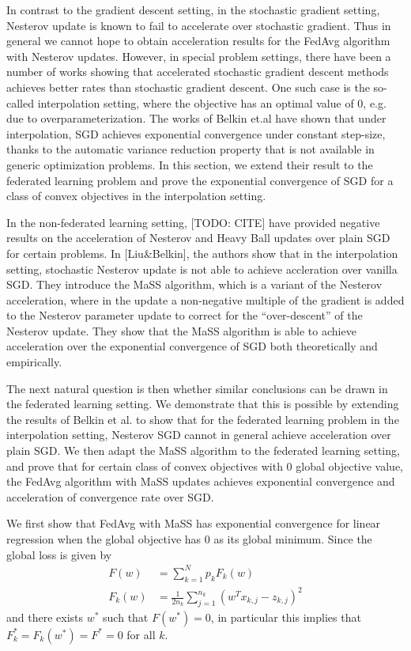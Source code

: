 In contrast to the gradient descent setting, in the stochastic gradient
setting, Nesterov update is known to fail to accelerate over stochastic
gradient. Thus in general we cannot hope to obtain acceleration results
for the FedAvg algorithm with Nesterov updates. However, in special
problem settings, there have been a number of works showing that accelerated
stochastic gradient descent methods achieves better rates than stochastic
gradient descent. One such case is the so-called interpolation setting,
where the objective has an optimal value of 0, e.g. due to overparameterization.
The works of Belkin et.al have shown that under interpolation, SGD
achieves exponential convergence under constant step-size, thanks
to the automatic variance reduction property that is not available
in generic optimization problems. In this section, we extend their
result to the federated learning problem and prove the exponential
convergence of SGD for a class of convex objectives in the interpolation
setting.

In the non-federated learning setting, {[}TODO: CITE{]} have provided
negative results on the acceleration of Nesterov and Heavy Ball updates
over plain SGD for certain problems. In {[}Liu\&Belkin{]}, the authors
show that in the interpolation setting, stochastic Nesterov update
is not able to achieve accleration over vanilla SGD. They introduce
the MaSS algorithm, which is a variant of the Nesterov acceleration,
where in the update a non-negative multiple of the gradient is added
to the Nesterov parameter update to correct for the ``over-descent''
of the Nesterov update. They show that the MaSS algorithm is able
to achieve acceleration over the exponential convergence of SGD both
theoretically and empirically.

The next natural question is then whether similar conclusions can
be drawn in the federated learning setting. We demonstrate that this
is possible by extending the results of Belkin et al. to show that
for the federated learning problem in the interpolation setting, Nesterov
SGD cannot in general achieve acceleration over plain SGD. We then
adapt the MaSS algorithm to the federated learning setting, and prove
that for certain class of convex objectives with 0 global objective
value, the FedAvg algorithm with MaSS updates achieves exponential
convergence and acceleration of convergence rate over SGD. 

We first show that FedAvg with MaSS has exponential convergence for
linear regression when the global objective has 0 as its global minimum.
Since the global loss is given by 
\begin{align*}
F(w) & =\sum_{k=1}^{N}p_{k}F_{k}(w)\\
F_{k}(w) & =\frac{1}{2n_{k}}\sum_{j=1}^{n_{k}}(w^{T}x_{k,j}-z_{k,j})^{2}
\end{align*}
and there exists $w^{\ast}$ such that $F(w^{\ast})=0$, in particular
this implies that $F_{k}^{\ast}=F_{k}(w^{\ast})=F^{\ast}=0$ for all
$k$.

